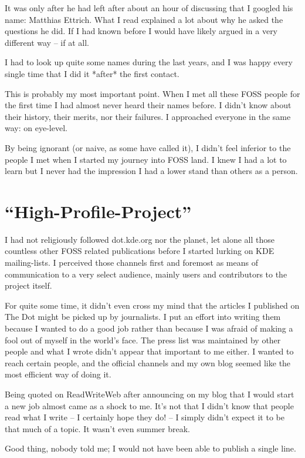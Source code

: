 It was only after he had left after about an hour of discussing that I googled his name: Matthias Ettrich. What I read explained a lot about why he asked the questions he did. If I had known before I would have likely argued in a very different way -- if at all.

I had to look up quite some names during the last years, and I was happy every single time that I did it *after* the first contact.

This is probably my most important point. When I met all these FOSS people for the first time I had almost never heard their names before. I didn't know about their history, their merits, nor their failures. I approached everyone in the same way: on eye-level. 

By being ignorant (or naive, as some have called it), I didn't feel inferior to the people I met when I started my journey into FOSS land. I knew I had a lot to learn but I never had the impression I had a lower stand than others as a person.

\section{``High-Profile-Project''}

I had not religiously followed dot.kde.org nor the planet, let alone all those countless other FOSS related publications before I started lurking on KDE mailing-lists. I perceived those channels first and foremost as means of communication to a very select audience, mainly users and  contributors to the project itself. 

For quite some time, it didn't even cross my mind that the articles I published on The Dot might be picked up by journalists. I put an effort into writing them because I wanted to do a good job rather than because I was afraid of making a fool out of myself in the world's face. The press list was maintained by other people and what I wrote didn't appear that important to me either. I wanted to reach certain people, and the official channels and my own blog seemed like the most efficient way of doing it.

Being quoted on ReadWriteWeb after announcing on my blog that I would start a new job almost came as a shock to me. It's not that I didn't know that people read what I write -- I certainly hope they do! -- I simply didn't expect it to be that much of a topic. It wasn't even summer break.

Good thing, nobody told me; I would not have been able to publish a single line.


